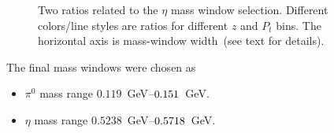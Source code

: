 \begin{figure}[h]
\centering     %
{}
\caption{Two ratios related to  the $\eta$ mass window selection. Different colors/line styles are ratios for different $z$ and $P_t$ bins. The horizontal axis is mass-window width~(see text for details).}
\label{fig:etaS}
\end{figure}
The final mass windows were chosen as
\begin{itemize}
\item $\pi^0$ mass range $0.119$~GeV$\textup{--}0.151$~GeV.
\item $\eta$ mass range $0.5238$~GeV$\textup{--}0.5718$~GeV.
\end{itemize}
